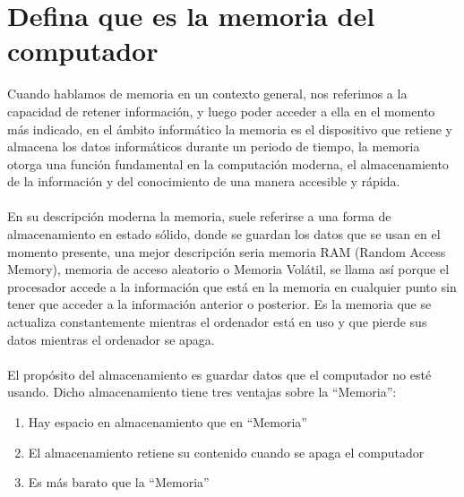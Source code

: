 \documentclass{article}
\begin{document}
	\section{Defina que es la memoria del computador} \label{defina}
	Cuando hablamos de memoria en un contexto general, nos referimos a la capacidad de retener información, y luego poder acceder a ella en el momento más indicado, en el ámbito informático la memoria es el dispositivo que retiene y almacena los datos informáticos durante un periodo de tiempo, la memoria otorga una función fundamental en la computación moderna, el almacenamiento de la información y del conocimiento de una manera accesible y rápida.
	\\\\
	En su descripción moderna la memoria, suele referirse a una forma de almacenamiento en estado sólido, donde se guardan los datos que se usan en el momento presente, una mejor descripción seria memoria RAM (Random Access Memory), memoria de acceso aleatorio o Memoria Volátil, se llama así porque el procesador accede a la información que está en la memoria en cualquier punto sin tener que acceder a la información anterior o posterior. Es la memoria que se actualiza constantemente mientras el ordenador está en uso y que pierde sus datos mientras el ordenador se apaga.
	\\\\
	El propósito del almacenamiento es guardar datos que el computador no esté usando. Dicho almacenamiento tiene tres ventajas sobre la “Memoria”:
	
	\begin{enumerate}
		
		\item Hay espacio en almacenamiento que en “Memoria”
		\item El almacenamiento retiene su contenido cuando se apaga el computador
		\item Es más barato que la “Memoria”
		
	\end{enumerate}
\end{document}
